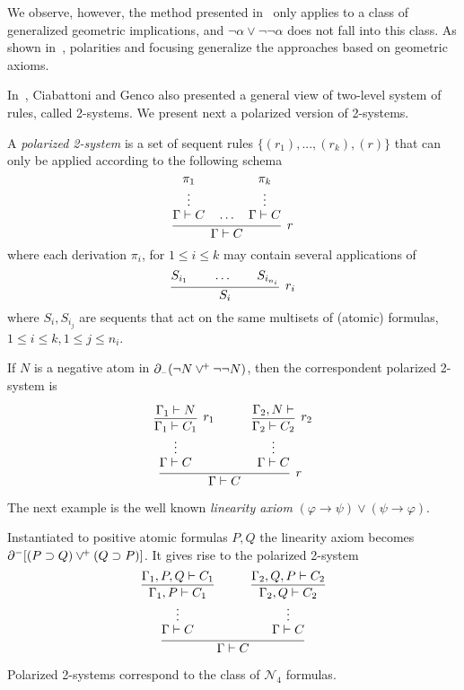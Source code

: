 \documentclass{llncs}
\begin{document}
We observe, however, the method presented in~\cite{Neg16}  only applies to a class of
generalized geometric implications, and $\neg \alpha\vee\neg\neg\alpha$ does not fall into this class. As shown in~\cite{DBLP:journals/apal/MarinMPV22}, polarities and focusing generalize the approaches based on geometric axioms.

In~\cite{DBLP:journals/tocl/CiabattoniG18}, Ciabattoni and Genco also presented a general view of two-level system of rules, called 2-systems. We present next a polarized version of 2-systems.
\begin{definition}
A  {\em polarized 2-system} is a set of sequent rules $\{(r_1), . . . , (r_k ), (r)\}$ that can only be applied according to the following schema
\[
\infer[r]{\Gamma\vdash C}
      {\deduce{\Gamma\vdash C\strut}
              {\deduce{\vdots}
                      {\pi_1}}\quad\ldots\quad
       \deduce{\Gamma\vdash C\strut}
              {\deduce{\vdots}
                      {\pi_k}}}
\]
where each derivation $\pi_i$, for $1\leq i \leq k$ may contain several applications of
\[
\infer[r_i]{S_i}
{S_{i_1}\qquad\ldots\qquad S_{i_{n_i}}}
\]
where $S_i,S_{i_j}$ are sequents that act on the same multisets of (atomic) formulas, $1\leq i\leq k, 1\leq j\leq n_i$. 
\end{definition}
\begin{example}
If $N$ is a negative atom in $\partial_{\scriptscriptstyle -}(\neg N \vee^{\!+} \neg\neg N)$, then the correspondent polarized 2-system is 
\[
\infer[r]{\Gamma\vdash C}
      {\deduce{\Gamma\vdash C\strut}
              {\deduce{\vdots}
                      {\infer[r_1]{\Gamma_1\vdash C_1}{\Gamma_1\vdash N}}}\quad&\quad
       \deduce{\Gamma\vdash C\strut}
              {\deduce{\vdots}
                      {\infer[r_2]{\Gamma_2\vdash C_2}
                             {\deduce{\Gamma_2,N\vdash }{}}}}}
\]
\end{example}
The next example is the well known \emph{linearity axiom} $(\varphi\to \psi)\vee (\psi\to \varphi)$.
\begin{example}\label{ex:linearity}
Instantiated to positive atomic formulas $P,Q$  the linearity axiom becomes $\partial^-[(P\supset Q)\vee^{\!+} (Q\supset P)]$. It gives rise to the polarized 2-system 
\[
\infer{\Gamma\vdash C}
      {\deduce{\Gamma\vdash C\strut}
              {\deduce{\vdots}
                      {\infer{\Gamma_1,P\vdash C_1}{\Gamma_1,P,Q\vdash C_1}}}\quad&\quad
       \deduce{\Gamma\vdash C\strut}
              {\deduce{\vdots}
                             {\infer{\Gamma_2,Q\vdash C_2}{\Gamma_2,Q,P\vdash C_2}}}}
\]
\end{example}
\begin{claim} Polarized 2-systems correspond to the class of
$\mathcal{N}_4$ formulas.
\end{claim}
\end{document}
